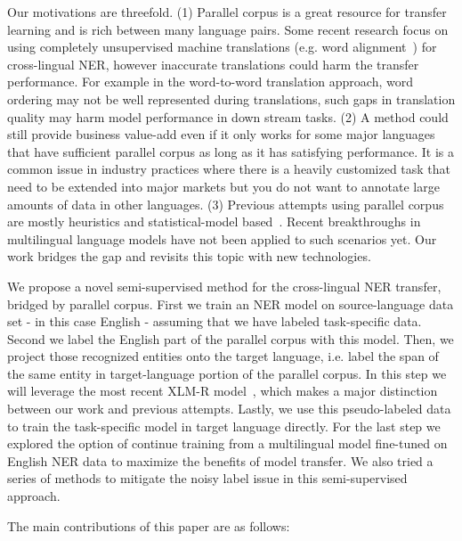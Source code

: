 \documentclass[11pt]{article}
\begin{document}
Our motivations are threefold. (1) Parallel corpus is a great resource for transfer learning and is rich between many language pairs. Some recent research focus on using completely unsupervised machine translations (e.g. word alignment~\cite{conneau2017word}) for cross-lingual NER, however inaccurate translations could harm the transfer performance. For example in the word-to-word translation approach, word ordering may not be well represented during translations, such gaps in translation quality may harm model performance in down stream tasks. (2) A method could still provide business value-add even if it only works for some major languages that have sufficient parallel corpus as long as it has satisfying performance. It is a common issue in industry practices where there is a heavily customized task that need to be extended into major markets but you do not want to annotate large amounts of data in other languages. (3) Previous attempts using parallel corpus are mostly heuristics and statistical-model based~\cite{jain2019entity, xie-etal-2018-neural, Ni2017}. Recent breakthroughs in multilingual language models have not been applied to such scenarios yet. Our work bridges the gap and revisits this topic with new technologies.

We propose a novel semi-supervised method for the cross-lingual NER transfer, bridged by parallel corpus. First we train an NER model on source-language data set - in this case English - assuming that we have labeled task-specific data. Second we label the English part of the parallel corpus with this model. Then, we project those recognized entities onto the target language, i.e. label the span of the same entity in target-language portion of the parallel corpus. In this step we will leverage the most recent XLM-R model~\cite{lample2019cross, Conneau2020}, which makes a major distinction between our work and previous attempts. Lastly, we use this pseudo-labeled data to train the task-specific model in target language directly. For the last step we explored the option of continue training from a multilingual model fine-tuned on English NER data to maximize the benefits of model transfer. We also tried a series of methods to mitigate the noisy label issue in this semi-supervised approach.

The main contributions of this paper are as follows:
\end{document}
